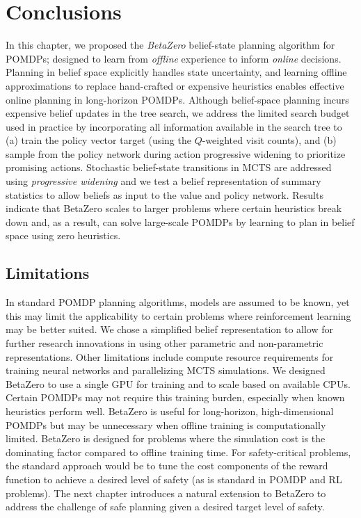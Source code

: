 \section{Conclusions}
In this chapter, we proposed the \textit{BetaZero} belief-state planning algorithm for POMDPs; designed to learn from \textit{offline} experience to inform \textit{online} decisions.
Planning in belief space explicitly handles state uncertainty, and learning offline approximations to replace hand-crafted or expensive heuristics enables effective online planning in long-horizon POMDPs.
Although belief-space planning incurs expensive belief updates in the tree search, we address the limited search budget used in practice by incorporating all information available in the search tree to (a) train the policy vector target (using the $Q$-weighted visit counts), and (b) sample from the policy network during action progressive widening to prioritize promising actions.
Stochastic belief-state transitions in MCTS are addressed using \textit{progressive widening} and we test a belief representation of summary statistics to allow beliefs as input to the value and policy network.
Results indicate that BetaZero scales to larger problems where certain heuristics break down and, as a result, can solve large-scale POMDPs by learning to plan in belief space using zero heuristics.

\subsection{Limitations}
In standard POMDP planning algorithms, models are assumed to be known, yet this may limit the applicability to certain problems where reinforcement learning may be better suited.
We chose a simplified belief representation to allow for further research innovations in using other parametric and non-parametric representations.
Other limitations include compute resource requirements for training neural networks and parallelizing MCTS simulations.
We designed BetaZero to use a single GPU for training and to scale based on available CPUs.
Certain POMDPs may not require this training burden, especially when known heuristics perform well.
BetaZero is useful for long-horizon, high-dimensional POMDPs but may be unnecessary when offline training is computationally limited.
BetaZero is designed for problems where the simulation cost is the dominating factor compared to offline training time.
For safety-critical problems, the standard approach would be to tune the cost components of the reward function to achieve a desired level of safety (as is standard in POMDP and RL problems).
The next chapter introduces a natural extension to BetaZero to address the challenge of safe planning given a desired target level of safety.